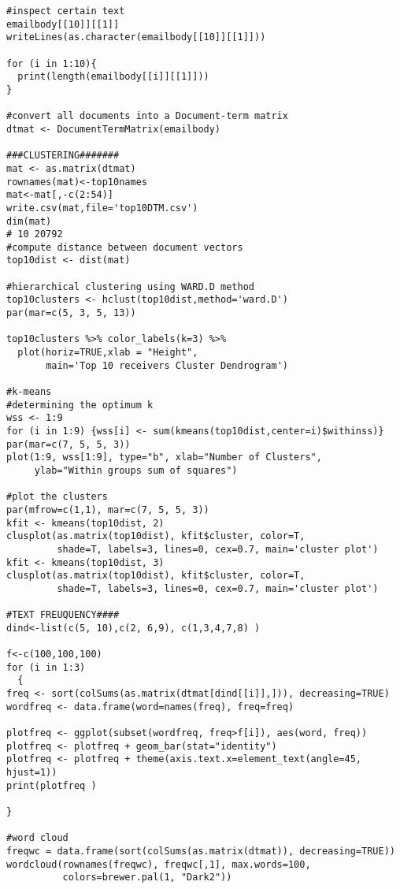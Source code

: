 \begin{verbatim}
#inspect certain text 
emailbody[[10]][[1]]
writeLines(as.character(emailbody[[10]][[1]]))

for (i in 1:10){
  print(length(emailbody[[i]][[1]]))
}

#convert all documents into a Document-term matrix
dtmat <- DocumentTermMatrix(emailbody)

###CLUSTERING#######
mat <- as.matrix(dtmat)
rownames(mat)<-top10names
mat<-mat[,-c(2:54)]
write.csv(mat,file='top10DTM.csv')
dim(mat)
# 10 20792
#compute distance between document vectors
top10dist <- dist(mat)

#hierarchical clustering using WARD.D method
top10clusters <- hclust(top10dist,method='ward.D')
par(mar=c(5, 3, 5, 13))

top10clusters %>% color_labels(k=3) %>% 
  plot(horiz=TRUE,xlab = "Height", 
       main='Top 10 receivers Cluster Dendrogram')

#k-means
#determining the optimum k
wss <- 1:9
for (i in 1:9) {wss[i] <- sum(kmeans(top10dist,center=i)$withinss)}
par(mar=c(7, 5, 5, 3))
plot(1:9, wss[1:9], type="b", xlab="Number of Clusters",
     ylab="Within groups sum of squares")

#plot the clusters
par(mfrow=c(1,1), mar=c(7, 5, 5, 3))
kfit <- kmeans(top10dist, 2)
clusplot(as.matrix(top10dist), kfit$cluster, color=T, 
         shade=T, labels=3, lines=0, cex=0.7, main='cluster plot')
kfit <- kmeans(top10dist, 3)
clusplot(as.matrix(top10dist), kfit$cluster, color=T, 
         shade=T, labels=3, lines=0, cex=0.7, main='cluster plot')

#TEXT FREUQUENCY####
dind<-list(c(5, 10),c(2, 6,9), c(1,3,4,7,8) )

f<-c(100,100,100)
for (i in 1:3)
  {
freq <- sort(colSums(as.matrix(dtmat[dind[[i]],])), decreasing=TRUE)   
wordfreq <- data.frame(word=names(freq), freq=freq)   

plotfreq <- ggplot(subset(wordfreq, freq>f[i]), aes(word, freq))    
plotfreq <- plotfreq + geom_bar(stat="identity")   
plotfreq <- plotfreq + theme(axis.text.x=element_text(angle=45, hjust=1))   
print(plotfreq )

}

#word cloud
freqwc = data.frame(sort(colSums(as.matrix(dtmat)), decreasing=TRUE))
wordcloud(rownames(freqwc), freqwc[,1], max.words=100, 
          colors=brewer.pal(1, "Dark2"))
\end{verbatim}